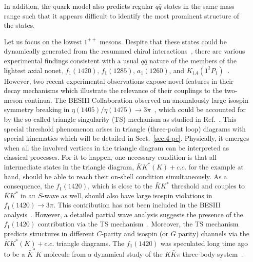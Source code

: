 In addition, the quark model also predicts regular $q\bar q$ states in the same
mass range such that it appears difficult to identify the most prominent
structure of the states.

Let us focus on the lowest $1^{++}$ mesons. Despite that these states could be
dynamically generated from the resummed chiral
interactions~\cite{Lutz:2003fm,Roca:2005nm}, there are various experimental
findings consistent with a usual $q\bar q$ nature of the members of the lightest
axial nonet, $f_1(1420)$, $f_1(1285)$, $a_1(1260)$, and
$K_{1A}(1^3P_1)$~\cite{Olive:2016xmw}.
 However, two recent experimental observations expose novel features
in their decay mechanisms which illustrate the relevance of their couplings to
the  two-meson continua. The BESIII Collaboration observed an anomalously large
isospin symmetry breaking in $\eta(1405)/\eta(1475)\to
3\pi$~\cite{BESIII:2012aa}, which could be accounted for by the so-called
triangle singularity (TS) mechanism as studied in Ref.~\cite{Wu:2011yx,Aceti:2012dj}.
This special threshold phenomenon {arises in triangle (three-point loop)
diagrams with special kinematics which} will be detailed in Sect.~\ref{sec:4-pc}.
Physically, it emerges when all the involved vertices in the triangle diagram
can be interpreted as classical processes. For it to happen, one necessary
condition is that all intermediate states in the triangle diagram,
$\bar{K}K^*(K)+c.c.$ for the example at hand, should be able to reach their
on-shell condition simultaneously. As a consequence, the $f_1(1420)$,
which is close to the $\bar K K^*$ threshold and couples to $\bar K K^*$ in an
$S$-wave as well, should also have large isospin violations in $f_1(1420)\to
3\pi$.
This contribution has not been included in the BESIII analysis~\cite{BESIII:2012aa}.  However, a detailed partial wave analysis
suggests the presence of the $f_1(1420)$ contribution via the TS
mechanism~\cite{Wu:2012pg}. Moreover, the TS mechanism predicts structures in
different $C$-parity and isospin (or $G$ parity) channels via the
$\bar{K}K^*(K)+c.c.$ triangle diagrams. The $f_1(1420)$ was speculated long time
ago to be a $\bar K^* K$ molecule from a dynamical study of the $K\bar K\pi$
three-body system~\cite{Longacre:1990uc}.

